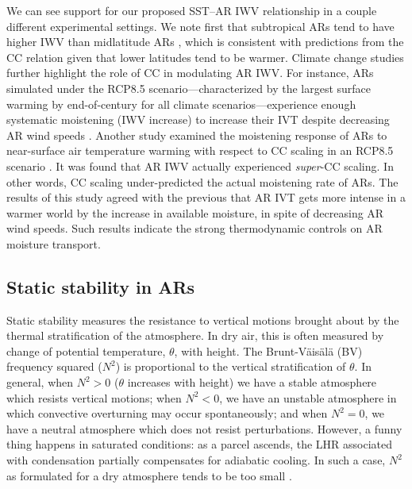 \documentclass[letterpaper,12pt]{article}
\begin{document}
We can see support for our proposed SST--AR IWV relationship in a couple different experimental settings. We note first that subtropical ARs tend to have higher IWV than midlatitude ARs \cite{Ralph2017DropsondeRivers}, which is consistent with predictions from the CC relation given that lower latitudes tend to be warmer. Climate change studies further highlight the role of CC in modulating AR IWV. For instance, ARs simulated under the RCP8.5 scenario---characterized by the largest surface warming by end-of-century for all climate scenarios---experience enough systematic moistening (IWV increase) to increase their IVT despite decreasing AR wind speeds \cite{Payne2015}. Another study examined the moistening response of ARs to near-surface air temperature warming with respect to CC scaling in an RCP8.5 scenario \cite{Gao2015}. It was found that AR IWV actually experienced \textit{super}-CC scaling. In other words, CC scaling under-predicted the actual moistening rate of ARs. The results of this study agreed with the previous that AR IVT gets more intense in a warmer world by the increase in available moisture, in spite of decreasing AR wind speeds. Such results indicate the strong thermodynamic controls on AR moisture transport.  



\subsection{Static stability in ARs}

Static stability measures the resistance to vertical motions brought about by the thermal stratification of the atmosphere. In dry air, this is often measured by change of potential temperature, $\theta$, with height. The Brunt-V\"ais\"al\"a (BV) frequency squared ($N^2$) is proportional to the vertical stratification of $\theta$. In general, when $N^2 > 0$ ($\theta$ increases with height) we have a stable atmosphere which resists vertical motions; when $N^2 < 0$, we have an unstable atmosphere in which convective overturning may occur spontaneously; and when $N^2 = 0$, we have a neutral atmosphere which does not resist perturbations. However, a funny thing happens in saturated conditions: as a parcel ascends, the LHR associated with condensation partially compensates for adiabatic cooling. In such a case, $N^2$ as formulated for a dry atmosphere tends to be too small  \cite{Durran1982OnFrequency}. 
\end{document}
